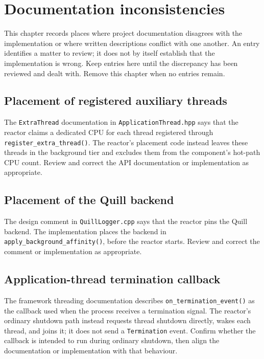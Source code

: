 \chapter{Documentation inconsistencies}
\label{ch:documentation_inconsistencies}

This chapter records places where project documentation disagrees with the
implementation or where written descriptions conflict with one another. An
entry identifies a matter to review; it does not by itself establish that the
implementation is wrong. Keep entries here until the discrepancy has been
reviewed and dealt with. Remove this chapter when no entries remain.

\section{Placement of registered auxiliary threads}
\label{sec:doc_issue_extra_thread_placement}

The \texttt{ExtraThread} documentation in
\texttt{ApplicationThread.hpp} says that the reactor claims a dedicated CPU
for each thread registered through \texttt{register\_extra\_thread()}. The
reactor's placement code instead leaves these threads in the background tier
and excludes them from the component's hot-path CPU count. Review and correct
the API documentation or implementation as appropriate.

\section{Placement of the Quill backend}
\label{sec:doc_issue_quill_placement}

The design comment in \texttt{QuillLogger.cpp} says that the reactor pins the
Quill backend. The implementation places the backend in
\texttt{apply\_background\_affinity()}, before the reactor starts. Review and
correct the comment or implementation as appropriate.

\section{Application-thread termination callback}
\label{sec:doc_issue_thread_termination_callback}

The framework threading documentation describes
\texttt{on\_termination\_event()} as the callback used when the process
receives a termination signal. The reactor's ordinary shutdown path instead
requests thread shutdown directly, wakes each thread, and joins it; it does
not send a \texttt{Termination} event. Confirm whether the callback is
intended to run during ordinary shutdown, then align the documentation or
implementation with that behaviour.
